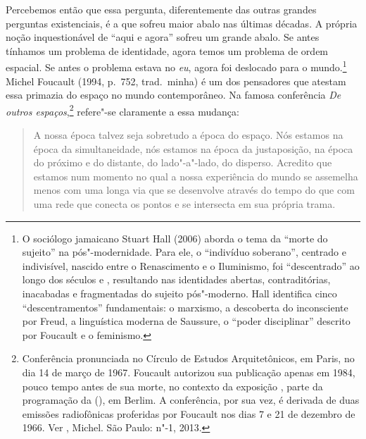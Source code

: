 Percebemos então que essa pergunta, diferentemente das outras grandes
perguntas existenciais, é a que sofreu maior abalo nas últimas décadas.
A própria noção inquestionável de ``aqui e agora'' sofreu um grande
abalo. Se antes tínhamos um problema de identidade, agora temos um
problema de ordem espacial. Se antes o problema estava no \emph{eu},
agora foi deslocado para o mundo.\footnote{O sociólogo jamaicano Stuart
  Hall (2006) aborda o tema da ``morte do sujeito'' na pós"-modernidade.
  Para ele, o ``indivíduo soberano'', centrado e indivisível, nascido
  entre o Renascimento e o Iluminismo, foi ``descentrado'' ao longo dos
  séculos  e , resultando nas identidades abertas, contraditórias,
  inacabadas e fragmentadas do sujeito pós"-moderno. Hall identifica
  cinco ``descentramentos'' fundamentais: o marxismo, a descoberta do
  inconsciente por Freud, a linguística moderna de Saussure, o ``poder
  disciplinar'' descrito por Foucault e o feminismo.} Michel Foucault
(1994, p.~752, trad.~minha) é
um dos pensadores que atestam essa primazia do espaço no mundo
contemporâneo. Na famosa conferência \emph{De outros espaços},\footnote{Conferência
  pronunciada no Círculo de Estudos Arquitetônicos, em Paris, no dia 14
  de março de 1967. Foucault autorizou sua publicação apenas em 1984,
  pouco tempo antes de sua morte, no contexto da exposição {}, parte da programação da {} (), em Berlim. A conferência, por sua vez, é
  derivada de duas emissões radiofônicas proferidas por Foucault nos
  dias 7 e 21 de dezembro de 1966. Ver , Michel. {} São Paulo: n"-1, 2013.} refere"-se claramente
a essa mudança:

\begin{quote}
A nossa época talvez seja sobretudo a época do espaço. Nós estamos na
época da simultaneidade, nós estamos na época da justaposição, na época
do próximo e do distante, do lado"-a"-lado, do disperso. Acredito que
estamos num momento no qual a nossa experiência do mundo se assemelha
menos com uma longa via que se desenvolve através do tempo do que com
uma rede que conecta os pontos e se intersecta em sua própria trama.
\end{quote}

